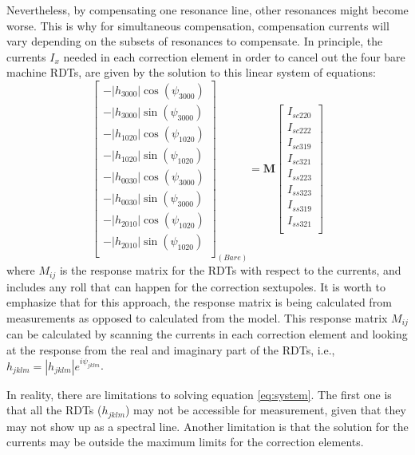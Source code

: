 Nevertheless, by compensating one resonance line, other resonances might become worse. This is why for simultaneous compensation, compensation currents will vary depending on the subsets of resonances to compensate. In principle, the currents $I_x$ needed in each correction element in order to cancel out the four bare machine RDTs, are given by the solution to this linear system of equations: 
\begin{equation}
    \begin{bmatrix}
        -|{h_{3000}}|  \cos (\psi_{3000})\\
        -|{h_{3000}}|  \sin (\psi_{3000})\\
        -|{h_{1020}}|  \cos (\psi_{1020})\\
        -|{h_{1020}}|  \sin (\psi_{1020})\\
        -|{h_{0030}}|  \cos (\psi_{3000})\\
        -|{h_{0030}}|  \sin (\psi_{3000})\\
        -|{h_{2010}}|  \cos (\psi_{1020})\\
        -|{h_{2010}}|  \sin (\psi_{1020})\\
      \end{bmatrix}_{(Bare)}
    =
      \boldsymbol{M}
    \begin{bmatrix}
        I_{sc220} \\
        I_{sc222} \\
        I_{sc319} \\
        I_{sc321} \\
        I_{ss223} \\
        I_{ss323} \\
        I_{ss319} \\
        I_{ss321} \\
      \end{bmatrix}
    \label{eq:system}
\end{equation}
where $M_{ij}$ is the response matrix for the RDTs with respect to the currents, and includes any roll that can happen for the correction sextupoles. It is worth to emphasize that for this approach, the response matrix is being calculated from measurements as opposed to calculated from the model. This response matrix $M_{ij}$ can be calculated by scanning the currents in each correction element and looking at the response from the real and imaginary part of the RDTs, i.e., $h_{jklm}=|h_{jklm}|e^{i\psi_{jklm}}$. 

In reality, there are limitations to solving equation \ref{eq:system}. The first one is that all the RDTs ($h_{jklm}$) may not be accessible for measurement, given that they may not show up as a spectral line.  Another limitation is that the solution for the currents may be outside the maximum limits for the correction elements. 

